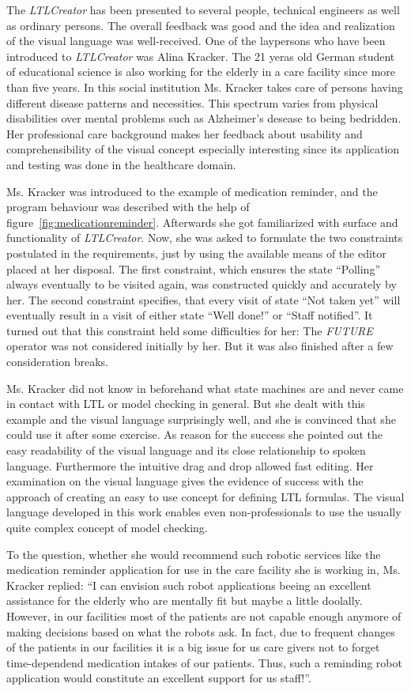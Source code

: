 The \emph{LTLCreator} has been presented to several people, technical engineers as well as ordinary persons. The overall feedback was good and the idea and realization of the visual language was well-received. One of the laypersons who have been introduced to \emph{LTLCreator} was Alina Kracker. The 21 yeras old German student of educational science is also working for the elderly in a care facility since more than five years. In this social institution Ms. Kracker takes care of persons having different disease patterns and necessities. This spectrum varies from physical disabilities over mental problems such as Alzheimer's desease to being bedridden.
Her professional care background makes her feedback about usability and comprehensibility of the visual concept especially interesting since its application and testing was done in the healthcare domain.

Ms. Kracker was introduced to the example of medication reminder, and the program behaviour was described with the help of figure~\ref{fig:medicationreminder}. Afterwards she got familiarized with surface and functionality of \emph{LTLCreator}. Now, she was asked to formulate the two constraints postulated in the requirements, just by using the available means of the editor placed at her disposal.
The first constraint, which ensures the state ``Polling'' always eventually to be visited again, was constructed quickly and accurately by her.
The second constraint specifies, that every visit of state ``Not taken yet'' will eventually result in a visit of either state ``Well done!'' or ``Staff notified''. It turned out that this constraint held some difficulties for her: The \emph{FUTURE} operator was not considered initially by her. But it was also finished after a few consideration breaks.

Ms. Kracker did not know in beforehand what state machines are and never came in contact with LTL or model checking in general. But she dealt with this example and the visual language surprisingly well, and she is convinced that she could use it after some exercise. As reason for the success she pointed out the easy readability of the visual language and its close relationship to spoken language. Furthermore the intuitive drag and drop allowed fast editing.
Her examination on the visual language gives the evidence of success with the approach of creating an easy to use concept for defining LTL formulas. The visual language developed in this work enables even non-professionals to use the usually quite complex concept of model checking.

To the question, whether she would recommend such robotic services like the medication reminder application for use in the care facility she is working in, Ms. Kracker replied: ``I can envision such robot applications beeing an excellent assistance for the elderly who are mentally fit but maybe a little doolally. However, in our facilities most of the patients are not capable enough anymore of making decisions based on what the robots ask. In fact, due to frequent changes of the patients in our facilities it is a big issue for us care givers not to forget time-dependend medication intakes of our patients. Thus, such a reminding robot application would constitute an excellent support for us staff!''.
